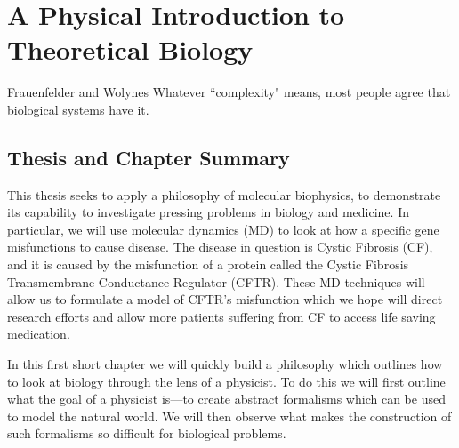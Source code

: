 \chapter{A Physical Introduction to Theoretical Biology}
\setcounter{page}{1}
\label{chap:introduction}

\begin{chapquote}  {Frauenfelder and Wolynes \cite{frauenfelder1994}}
Whatever ``complexity" means, most people agree that biological systems have it.
\end{chapquote}

\section{Thesis and Chapter Summary}

This thesis seeks to apply a philosophy of molecular biophysics, to demonstrate its capability to investigate pressing problems in biology and medicine. In particular, we will use molecular dynamics (MD) to look at how a specific gene misfunctions to cause disease. The disease in question is Cystic Fibrosis (CF), and it is caused by the misfunction of a protein called the Cystic Fibrosis Transmembrane Conductance Regulator (CFTR). These MD techniques will allow us to formulate a model of CFTR's misfunction which we hope will direct research efforts and allow more patients suffering from CF to access life saving medication. 

In this first short chapter we will quickly build a philosophy which outlines how to look at biology through the lens of a physicist. To do this we will first outline what the goal of a physicist is---to create abstract formalisms which can be used to model the natural world. We will then observe what makes the construction of such formalisms so difficult for biological problems. 

